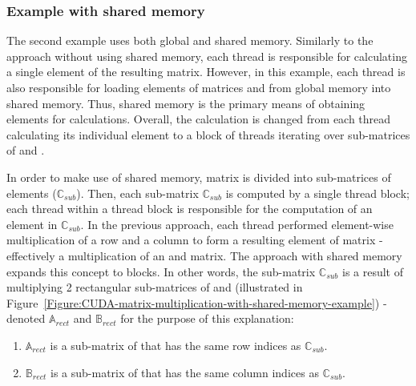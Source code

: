 \subsubsection{Example with shared memory \TO}
The second example uses both global and shared memory. Similarly to the approach without using shared memory, each thread is responsible for calculating a single element of the resulting  matrix. However, in this example, each thread is also responsible for loading elements of matrices  and  from global memory into shared memory. Thus, shared memory is the primary means of obtaining elements for calculations. Overall, the calculation is changed from each thread calculating its individual element to a block of threads iterating over sub-matrices of  and . \\
\par In order to make use of shared memory, matrix  is divided into sub-matrices of  elements ($ \mathbb{C}_{sub} $). Then, each sub-matrix $ \mathbb{C}_{sub} $ is computed by a single thread block; each thread within a thread block is responsible for the computation of an element in $ \mathbb{C}_{sub} $. In the previous approach, each thread performed element-wise multiplication of a row and a column to form a resulting element of matrix  - effectively a multiplication of an  and  matrix. The approach with shared memory expands this concept to blocks. In other words, the sub-matrix $ \mathbb{C}_{sub} $ is a result of multiplying 2 rectangular sub-matrices of  and  (illustrated in Figure~\ref{Figure:CUDA-matrix-multiplication-with-shared-memory-example}) - denoted $ \mathbb{A}_{rect} $ and $ \mathbb{B}_{rect} $ for the purpose of this explanation:

\begin{enumerate}
	\item $ \mathbb{A}_{rect} $ is a  sub-matrix of  that has the same row indices as $ \mathbb{C}_{sub} $.
	\item $ \mathbb{B}_{rect} $ is a  sub-matrix of  that has the same column indices as $ \mathbb{C}_{sub} $.
\end{enumerate}

